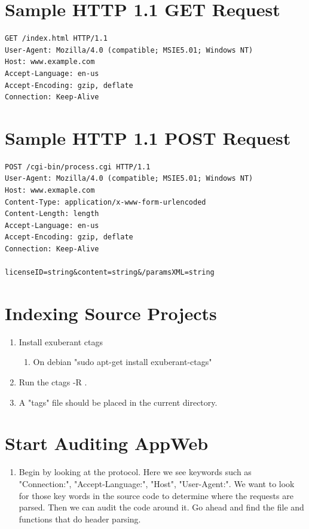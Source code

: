 \documentclass[12pt]{Training}
\begin{document}
\section*{Sample HTTP 1.1 GET Request}
\begin{sectionbox}
\begin{lstlisting}
GET /index.html HTTP/1.1
User-Agent: Mozilla/4.0 (compatible; MSIE5.01; Windows NT)
Host: www.example.com
Accept-Language: en-us
Accept-Encoding: gzip, deflate
Connection: Keep-Alive
\end{lstlisting}
\end{sectionbox}

\section*{Sample HTTP 1.1 POST Request}
\begin{sectionbox}
\begin{lstlisting}
POST /cgi-bin/process.cgi HTTP/1.1
User-Agent: Mozilla/4.0 (compatible; MSIE5.01; Windows NT)
Host: www.exmaple.com
Content-Type: application/x-www-form-urlencoded
Content-Length: length
Accept-Language: en-us
Accept-Encoding: gzip, deflate
Connection: Keep-Alive

licenseID=string&content=string&/paramsXML=string
\end{lstlisting}
\end{sectionbox}

\section*{Indexing Source Projects}
\begin{enumerate}
    \item Install exuberant ctags
        \begin{enumerate}
            \item On debian "sudo apt-get install exuberant-ctags"
        \end{enumerate}
    \item Run the ctags -R . 
    \item A "tags" file should be placed in the current directory.
\end{enumerate}

\section*{Start Auditing AppWeb}
\begin{enumerate}
    \item Begin by looking at the protocol. Here we see keywords such as "Connection:", "Accept-Language:", "Host", "User-Agent:". We want to look for those key words in the source code to determine where the requests are parsed. Then we can audit the code around it. Go ahead and find the file and functions that do header parsing.
\end{enumerate}
\end{document}
